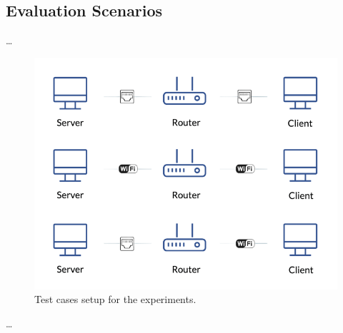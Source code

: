 
    \subsection{Evaluation Scenarios} \label{subsec:evaluation-scenarios}

        \ldots

        \begin{figure}[ht]
            \centering
            \includegraphics[width=0.8\columnwidth]{../images/test_cases_white.png}
            \caption{Test cases setup for the experiments.}
            \label{fig:test-cases}
        \end{figure}

        \ldots
